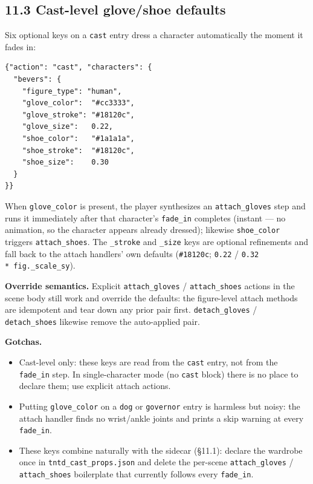 \documentclass[
  11pt,
]{book}
\begin{document}
\subsection{\texorpdfstring{11.3 Cast-level glove/shoe
defaults}{11.3 Cast-level glove/shoe defaults}}\label{cast-level-glove-shoe-defaults}

Six optional keys on a \texttt{cast} entry dress a character
automatically the moment it fades in:

\begin{verbatim}
{"action": "cast", "characters": {
  "bevers": {
    "figure_type": "human",
    "glove_color":  "#cc3333",
    "glove_stroke": "#18120c",
    "glove_size":   0.22,
    "shoe_color":   "#1a1a1a",
    "shoe_stroke":  "#18120c",
    "shoe_size":    0.30
  }
}}
\end{verbatim}

When \texttt{glove\_color} is present, the player synthesizes an
\texttt{attach\_gloves} step and runs it immediately after that
character's \texttt{fade\_in} completes (instant --- no animation, so
the character appears already dressed); likewise
\texttt{shoe\_color} triggers \texttt{attach\_shoes}. The
\texttt{\_stroke} and \texttt{\_size} keys are optional refinements
and fall back to the attach handlers' own defaults
(\texttt{\#18120c}; \texttt{0.22} / \texttt{0.32}
\texttt{*\ fig.\_scale\_sy}).

\textbf{Override semantics.} Explicit \texttt{attach\_gloves} /
\texttt{attach\_shoes} actions in the scene body still work and
override the defaults: the figure-level attach methods are idempotent
and tear down any prior pair first. \texttt{detach\_gloves} /
\texttt{detach\_shoes} likewise remove the auto-applied pair.

\textbf{Gotchas.}

\begin{itemize}
\item
  Cast-level only: these keys are read from the \texttt{cast} entry,
  not from the \texttt{fade\_in} step. In single-character mode (no
  \texttt{cast} block) there is no place to declare them; use explicit
  attach actions.
\item
  Putting \texttt{glove\_color} on a \texttt{dog} or
  \texttt{governor} entry is harmless but noisy: the attach handler
  finds no wrist/ankle joints and prints a skip warning at every
  \texttt{fade\_in}.
\item
  These keys combine naturally with the sidecar (§11.1): declare the
  wardrobe once in \texttt{tntd\_cast\_props.json} and delete the
  per-scene \texttt{attach\_gloves} / \texttt{attach\_shoes}
  boilerplate that currently follows every \texttt{fade\_in}.
\end{itemize}
\end{document}
